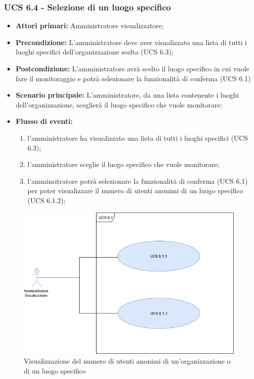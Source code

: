 \subsubsection{UCS 6.4 - Selezione di un luogo specifico}
\begin{itemize}
	\item \textbf{Attori primari:} Amministratore visualizzatore;
	\item \textbf{Precondizione:} L'amministratore deve aver visualizzato una lista di tutti i luoghi specifici dell'organizzazione scelta (UCS 6.3);
	\item \textbf{Postcondizione:} L'amministratore avrà scelto il luogo specifico in cui vuole fare il monitoraggio e potrà selezionare la funzionalità di conferma (UCS 6.1)
	\item \textbf{Scenario principale:} L'amministratore, da una lista contenente i luoghi dell'organizzazione, sceglierà il luogo specifico che vuole monitorare;
	\item \textbf{Flusso di eventi:} 
	\begin{enumerate}
		\item l'amministratore ha visualizzato una lista di tutti i luoghi specifici (UCS 6.3);
		\item l'amministratore sceglie il luogo specifico che vuole monitorare;
		\item l'amminsitratore potrà selezionare la funzionalità di conferma (UCS 6.1) per poter visualizzare il numero di utenti anonimi di un luogo specifico (UCS 6.1.2);
	\end{enumerate}
\end{itemize}


\begin{figure}[h]
	\centering
	\includegraphics[scale=0.3]{sezioni/UseCase/Immagini/UCS6_1.png}
	\caption{Visualizzazione del numero di utenti anonimi di un'organizzazione o di un luogo specifico}
\end{figure}


